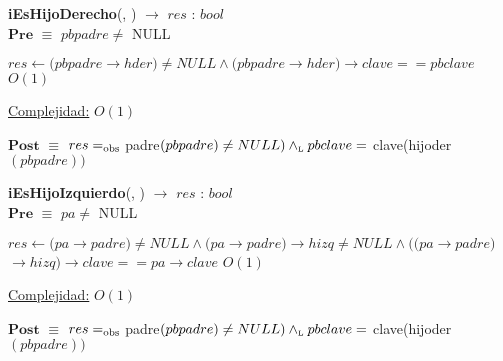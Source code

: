 \begin{algorithm}[H]{\textbf{iEsHijoDerecho}(, ) $\to$ $res$ : $bool$}
	{\\ $\textbf{Pre}$ $\equiv$ $pbpadre \neq$ NULL}
	\begin{algorithmic}[1]

		\State $res \gets (pbpadre$$\rightarrow$$hder) \neq NULL \land (pbpadre$$\rightarrow$$hder)$$\rightarrow$$clave == pbclave$ \Comment $O(1)$

		\medskip
		\Statex \underline{Complejidad:} $O(1)$

    \end{algorithmic}
    {$\textbf{Post}$ $\equiv$ $res =_{\mathrm{obs}}$ padre$(pbpadre) \neq NULL) \land_{\mathrm{\scriptscriptstyle{L}}} pbclave =$ clave(hijoder$(pbpadre))$}
\end{algorithm}


\begin{algorithm}[H]{\textbf{iEsHijoIzquierdo}(, ) $\to$ $res$ : $bool$}
	{\\ $\textbf{Pre}$ $\equiv$ $pa \neq$ NULL}
	\begin{algorithmic}[1]

		\State $res \gets (pa$$\rightarrow$$padre) \neq NULL \land (pa$$\rightarrow$$padre)$$\rightarrow$$hizq \neq NULL \land ((pa$$\rightarrow$$padre)$$\rightarrow$$hizq)$$\rightarrow$$clave == pa$$\rightarrow$$clave$ \Comment $O(1)$

		\medskip
		\Statex \underline{Complejidad:} $O(1)$

    \end{algorithmic}
    {$\textbf{Post}$ $\equiv$ $res =_{\mathrm{obs}}$ padre$(pbpadre) \neq NULL) \land_{\mathrm{\scriptscriptstyle{L}}} pbclave =$ clave(hijoder$(pbpadre))$}
\end{algorithm}


